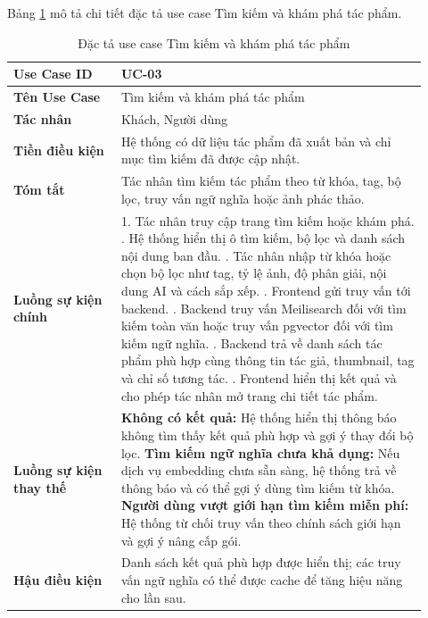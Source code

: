 Bảng \ref{table:2_4} mô tả chi tiết đặc tả use case Tìm kiếm và khám phá tác phẩm.
\begin{table}[h!]
    \caption{Đặc tả use case Tìm kiếm và khám phá tác phẩm}
    \label{table:2_4}
\centering
\small
\renewcommand{\arraystretch}{1.2}
\begin{tabular}{|p{0.24\linewidth}|p{0.68\linewidth}|}
\hline
\textbf{Use Case ID} & UC-03 \\
\hline
\textbf{Tên Use Case} & Tìm kiếm và khám phá tác phẩm \\
\hline
\textbf{Tác nhân} & Khách, Người dùng \\
\hline
\textbf{Tiền điều kiện} & Hệ thống có dữ liệu tác phẩm đã xuất bản và chỉ mục tìm kiếm đã được cập nhật. \\
\hline
\textbf{Tóm tắt} & Tác nhân tìm kiếm tác phẩm theo từ khóa, tag, bộ lọc, truy vấn ngữ nghĩa hoặc ảnh phác thảo. \\
\hline
\textbf{Luồng sự kiện chính} &
1. Tác nhân truy cập trang tìm kiếm hoặc khám phá. \newline
2. Hệ thống hiển thị ô tìm kiếm, bộ lọc và danh sách nội dung ban đầu. \newline
3. Tác nhân nhập từ khóa hoặc chọn bộ lọc như tag, tỷ lệ ảnh, độ phân giải, nội dung AI và cách sắp xếp. \newline
4. Frontend gửi truy vấn tới backend. \newline
5. Backend truy vấn Meilisearch đối với tìm kiếm toàn văn hoặc truy vấn pgvector đối với tìm kiếm ngữ nghĩa. \newline
6. Backend trả về danh sách tác phẩm phù hợp cùng thông tin tác giả, thumbnail, tag và chỉ số tương tác. \newline
7. Frontend hiển thị kết quả và cho phép tác nhân mở trang chi tiết tác phẩm. \\
\hline
\textbf{Luồng sự kiện thay thế} &
\textbf{Không có kết quả:} Hệ thống hiển thị thông báo không tìm thấy kết quả phù hợp và gợi ý thay đổi bộ lọc. \newline
\textbf{Tìm kiếm ngữ nghĩa chưa khả dụng:} Nếu dịch vụ embedding chưa sẵn sàng, hệ thống trả về thông báo và có thể gợi ý dùng tìm kiếm từ khóa. \newline
\textbf{Người dùng vượt giới hạn tìm kiếm miễn phí:} Hệ thống từ chối truy vấn theo chính sách giới hạn và gợi ý nâng cấp gói. \\
\hline
\textbf{Hậu điều kiện} & Danh sách kết quả phù hợp được hiển thị; các truy vấn ngữ nghĩa có thể được cache để tăng hiệu năng cho lần sau. \\
\hline
\end{tabular}
\end{table}
\FloatBarrier

